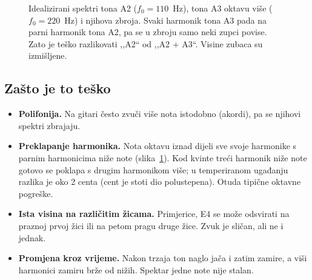 \documentclass[11pt,a4paper]{article}
\theoremstyle{definition}
\theoremstyle{plain}
\theoremstyle{remark}
\begin{document}
\begin{figure}[ht]
\centering
{}
\caption{Idealizirani spektri tona A2 ($f_0=110$~Hz), tona A3 oktavu više ($f_0=220$~Hz) i njihova
zbroja. Svaki harmonik tona A3 pada na parni harmonik tona A2, pa se u zbroju samo neki zupci
povise. Zato je teško razlikovati ,,A2`` od ,,A2 + A3``. Visine zubaca su izmišljene.}
\label{fig:cesalj}
\end{figure}

\subsection{Zašto je to teško}

\begin{itemize}
\item \textbf{Polifonija.} Na gitari često zvuči više nota istodobno (akordi), pa se njihovi
  spektri zbrajaju.
\item \textbf{Preklapanje harmonika.} Nota oktavu iznad dijeli sve svoje harmonike s parnim
  harmonicima niže note (slika~\ref{fig:cesalj}). Kod kvinte treći harmonik niže note gotovo se
  poklapa s drugim harmonikom više; u temperiranom ugađanju razlika je oko 2 centa (cent je
  stoti dio polustepena). Otuda tipične oktavne pogreške.
\item \textbf{Ista visina na različitim žicama.} Primjerice, E4 se može odsvirati na praznoj prvoj
  žici ili na petom pragu druge žice. Zvuk je sličan, ali ne i jednak.
\item \textbf{Promjena kroz vrijeme.} Nakon trzaja ton naglo jača i zatim zamire, a viši harmonici
  zamiru brže od nižih. Spektar jedne note nije stalan.
\end{itemize}
\end{document}

